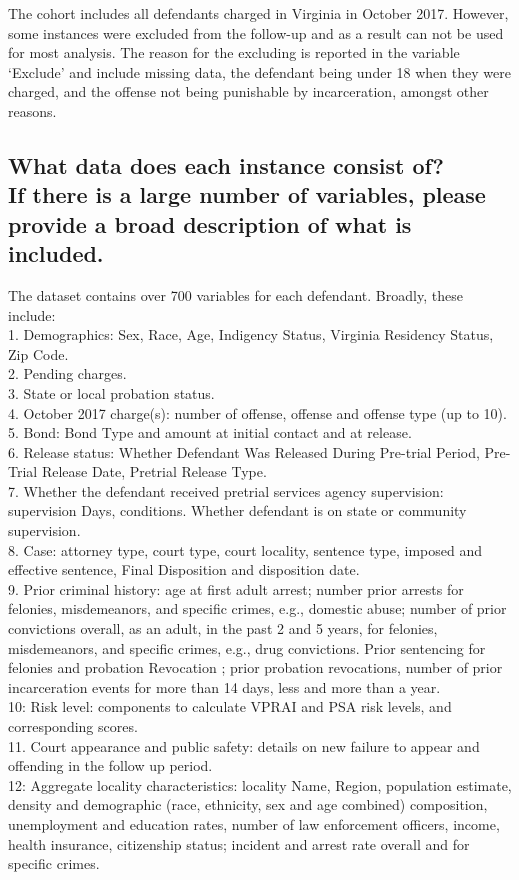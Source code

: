 \documentclass[letterpaper, 10 pt, conference]{ieeeconf}  %
\newcommand{\subtitle}[1]{{\\ \small \normalfont \color{purple} #1}}
\begin{document}
The cohort includes all defendants charged in Virginia in October 2017. However, some instances were excluded from the follow-up and as a result can not be used for most analysis. The reason for the excluding is reported in the variable `Exclude' and include missing data, the defendant being under 18 when they were charged, and the offense not being punishable by incarceration, amongst other reasons. 

\subsection{What data does each instance consist of? \subtitle{If there is a large number of variables, please provide a broad description of what is included.}}

The dataset contains over 700 variables for each defendant. Broadly, these include: \\
1. Demographics: Sex, Race, Age, Indigency Status, Virginia Residency Status, Zip Code. \\
2. Pending charges. \\
3. State or local probation status. \\
4. October 2017 charge(s): number of offense, offense and offense type (up to 10). \\
5. Bond: Bond Type and amount at initial contact and at release. \\
6. Release status: Whether Defendant Was Released During Pre-trial Period, Pre-Trial Release Date, Pretrial Release Type. \\
7. Whether the defendant received pretrial services agency supervision: supervision Days, conditions. Whether defendant is on state or community supervision. \\
8. Case: attorney type, court type, court locality, sentence type, imposed and effective sentence, Final Disposition and  disposition date. \\
9. Prior criminal history: age at first adult arrest; number prior arrests for felonies, misdemeanors, and specific crimes, e.g., domestic abuse; number of prior convictions overall, as an adult, in the past 2 and 5 years, for felonies, misdemeanors, and specific crimes, e.g., drug convictions. Prior sentencing for felonies and probation Revocation ; prior probation revocations, number of prior incarceration events for more than 14 days, less and more than a year. \\
10: Risk level: components to calculate VPRAI \cite{VPRAI} and PSA \cite{PSA} risk levels, and corresponding scores.  \\
11. Court appearance and public safety: details on new failure to appear and offending in the follow up period. \\ 
12: Aggregate locality characteristics: locality Name, Region, population estimate, density and demographic (race, ethnicity, sex and age combined) composition, unemployment and education rates, number of law enforcement officers, income, health insurance, citizenship status; incident and arrest rate overall and for specific crimes. 
\end{document}
